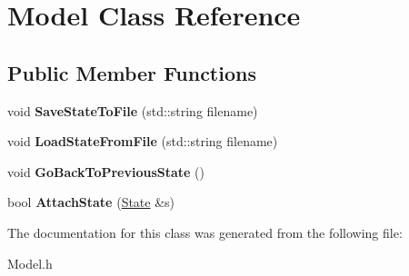 \hypertarget{classModel}{}\section{Model Class Reference}
\label{classModel}
\subsection*{Public Member Functions}
\begin{DoxyCompactItemize}
\item 
\mbox{\label{classModel_a00377628187a30d8232110df56d15771}} 
void {\bfseries Save\+State\+To\+File} (std\+::string filename)
\item 
\mbox{\label{classModel_a64abdebeccd4fcd19d41a14d87aeebd5}} 
void {\bfseries Load\+State\+From\+File} (std\+::string filename)
\item 
\mbox{\label{classModel_a5842c35a0dda88f6c0bd1e5f8a1ed404}} 
void {\bfseries Go\+Back\+To\+Previous\+State} ()
\item 
\mbox{\label{classModel_a1bc43dc264d3772403975d8e1955ddb0}} 
bool {\bfseries Attach\+State} (\hyperlink{classState}{State} \&s)
\end{DoxyCompactItemize}


The documentation for this class was generated from the following file\+:\begin{DoxyCompactItemize}
\item 
Model.\+h\end{DoxyCompactItemize}
